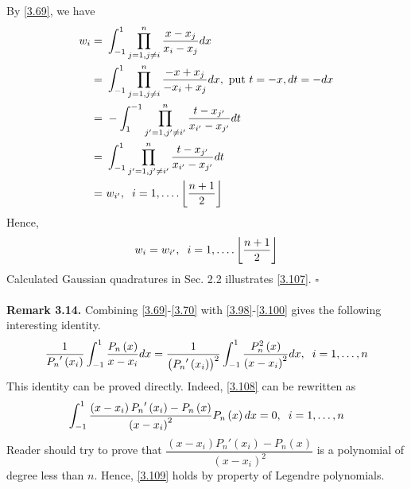 \documentclass[a4paper]{article}
\numberwithin{equation}{section}
\begin{document}
By \eqref{3.69}, we have
\begin{align}
{w_i} =&\ \int_{ - 1}^1 {\prod\limits_{j = 1,j \ne i}^n {\frac{{x - {x_j}}}{{{x_i} - {x_j}}}} dx} \\
 =&\ \int_{ - 1}^1 {\prod\limits_{j = 1,j \ne i}^n {\frac{{ - x + {x_j}}}{{ - {x_i} + {x_j}}}} dx} ,\mbox{ put }t =  - x,dt =  - dx\\
 =&\  - \int_1^{ - 1} {\prod\limits_{j' = 1,j' \ne i'}^n {\frac{{t - {x_{j'}}}}{{{x_{i'}} - {x_{j'}}}}} dt} \\
 =&\ \int_{ - 1}^1 {\prod\limits_{j' = 1,j' \ne i'}^n {\frac{{t - {x_{j'}}}}{{{x_{i'}} - {x_{j'}}}}} dt} \\
=&\ {w_{i'}},\hspace{0.2cm} i = 1, \ldots .\left\lfloor {\frac{{n + 1}}{2}} \right\rfloor 
\end{align}
Hence,
\begin{align}
\label{3.107}
{w_i} = {w_{i'}},\hspace{0.2cm}i = 1, \ldots .\left\lfloor {\frac{{n + 1}}{2}} \right\rfloor 
\end{align}
Calculated Gaussian quadratures in Sec. 2.2 illustrates \eqref{3.107}. \hfill $\square$\\
\\
\textbf{Remark 3.14.} Combining \eqref{3.69}-\eqref{3.70} with \eqref{3.98}-\eqref{3.100} gives the following interesting identity.
\begin{align}
\label{3.108}
\frac{1}{{{P_n}'\left( {{x_i}} \right)}}\int_{ - 1}^1 {\frac{{{P_n}\left( x \right)}}{{x - {x_i}}}dx}  = \frac{1}{{{{\left( {{P_n}'\left( {{x_i}} \right)} \right)}^2}}}\int_{ - 1}^1 {\frac{{P_n^2\left( x \right)}}{{{{\left( {x - {x_i}} \right)}^2}}}dx} ,\hspace{0.2cm} i = 1, \ldots ,n
\end{align}
This identity can be proved directly. Indeed, \eqref{3.108} can be rewritten as
\begin{align}
\label{3.109}
\int_{ - 1}^1 {\frac{{\left( {x - {x_i}} \right){P_n}'\left( {{x_i}} \right) - {P_n}\left( x \right)}}{{{{\left( {x - {x_i}} \right)}^2}}}{P_n}\left( x \right)dx}  = 0,\hspace{0.2cm}i = 1, \ldots ,n
\end{align}
Reader should try to prove that $\dfrac{{\left( {x - {x_i}} \right){P_n}'\left( {{x_i}} \right) - {P_n}\left( x \right)}}{{{{\left( {x - {x_i}} \right)}^2}}}$ is a polynomial of degree less than $n$. Hence, \eqref{3.109} holds by property of Legendre polynomials.\\
\end{document}
